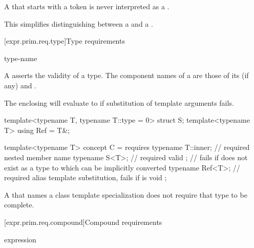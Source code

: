 \pnum
A  that starts with a  token
is never interpreted as a .
\begin{note}
This simplifies distinguishing between a 
and a .
\end{note}

[expr.prim.req.type]{Type requirements}
%

\begin{bnf}
\br
      type-name \terminal{;}
\end{bnf}

\pnum
A  asserts the validity of a type.
The component names of a  are those of its
 (if any) and .
\begin{note}
The enclosing  will evaluate to 
if substitution of template arguments fails.
\end{note}
\begin{example}
\begin{codeblock}
template<typename T, typename T::type = 0> struct S;
template<typename T> using Ref = T&;

template<typename T> concept C = requires {
  typename T::inner;    // required nested member name
  typename S<T>;        // required valid ;
                        // fails if  does not exist as a type to which  can be implicitly converted
  typename Ref<T>;      // required alias template substitution, fails if  is void
};
\end{codeblock}
\end{example}

\pnum
A  that names a class template specialization
does not require that type to be complete.

[expr.prim.req.compound]{Compound requirements}
%

\begin{bnf}
\br
    \terminal{\{} expression \terminal{\}}   \terminal{;}
\end{bnf}

